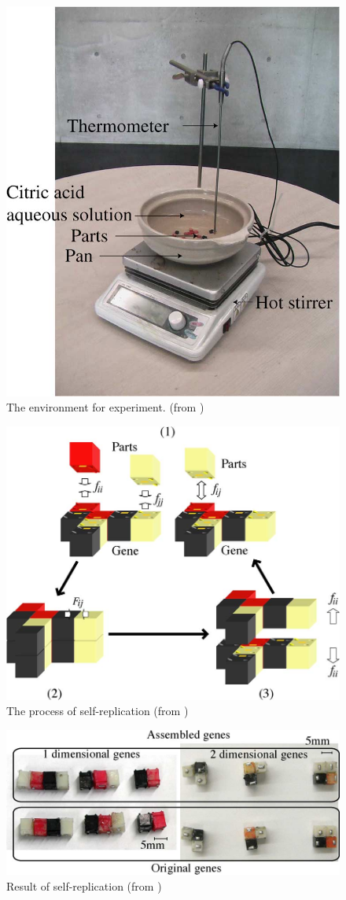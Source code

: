 \documentclass[12pt,twoside]{article}
\theoremstyle{plain}
\theoremstyle{definition}
\theoremstyle{remark}
\begin{document}
\begin{figure}[h]
	 \centerline{\includegraphics[width=.55\textwidth]{matsu-003}}
	 {\caption{The environment for experiment. (from \cite{matsumoto_passive_2009})}
	 \label{fig:matsu-env}}
\end{figure}

\begin{figure}[h]
	 \centerline{\includegraphics[width=.5\textwidth]{matsu-000}}
	 {\caption{The process of self-replication (from \cite{matsumoto_passive_2009})}
	 \label{fig:matsu-modes}}
\end{figure}

\begin{figure}[h]
	 \centerline{\includegraphics[width=.7\textwidth]{matsu-019}}
	 {\caption{Result of self-replication (from \cite{matsumoto_passive_2009})}
	 \label{fig:matsu-res}}
\end{figure}
\end{document}
